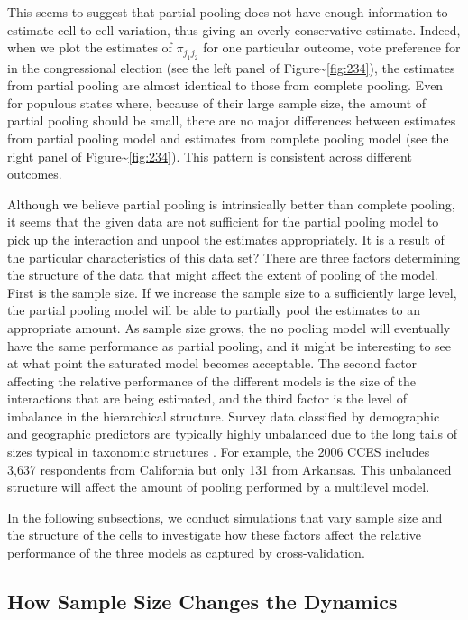 \documentclass[11pt,article,oneside]{memoir}
\begin{document}
This seems to suggest that partial pooling does not have enough
information to estimate cell-to-cell variation, thus giving an overly
conservative estimate. Indeed, when we plot the estimates of
\(\pi_{j_1j_2}\) for one particular outcome, vote preference for in the
congressional election (see the left panel of
Figure\textasciitilde{}\ref{fig:234}), the estimates from partial
pooling are almost identical to those from complete pooling. Even for
populous states where, because of their large sample size, the amount of
partial pooling should be small, there are no major differences between
estimates from partial pooling model and estimates from complete pooling
model (see the right panel of Figure\textasciitilde{}\ref{fig:234}).
This pattern is consistent across different outcomes.

Although we believe partial pooling is intrinsically better than
complete pooling, it seems that the given data are not sufficient for
the partial pooling model to pick up the interaction and unpool the
estimates appropriately. It is a result of the particular
characteristics of this data set? There are three factors determining
the structure of the data that might affect the extent of pooling of the
model. First is the sample size. If we increase the sample size to a
sufficiently large level, the partial pooling model will be able to
partially pool the estimates to an appropriate amount. As sample size
grows, the no pooling model will eventually have the same performance as
partial pooling, and it might be interesting to see at what point the
saturated model becomes acceptable. The second factor affecting the
relative performance of the different models is the size of the
interactions that are being estimated, and the third factor is the level
of imbalance in the hierarchical structure. Survey data classified by
demographic and geographic predictors are typically highly unbalanced
due to the long tails of sizes typical in taxonomic structures
\citep{Mandelbrot:1955}. For example, the 2006 CCES includes 3,637
respondents from California but only 131 from Arkansas. This unbalanced
structure will affect the amount of pooling performed by a multilevel
model.

In the following subsections, we conduct simulations that vary sample
size and the structure of the cells to investigate how these factors
affect the relative performance of the three models as captured by
cross-validation.

\subsection{How Sample Size Changes the
Dynamics}\label{how-sample-size-changes-the-dynamics}
\end{document}
